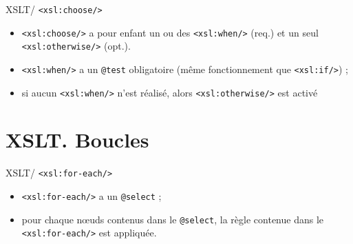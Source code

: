 \documentclass{beamer}
\begin{document}
    \begin{frame}{XSLT/ \texttt{<xsl:choose/>}}
        \Large
        \begin{itemize}
            \item \texttt{<xsl:choose/>} a pour enfant un ou des \texttt{<xsl:when/>} (req.) et un seul \texttt{<xsl:otherwise/>} (opt.).
            \bigskip
            \item \texttt{<xsl:when/>} a un \texttt{@test} obligatoire (même fonctionnement que \texttt{<xsl:if/>}) ;
            \bigskip
            \item si aucun \texttt{<xsl:when/>} n'est réalisé, alors \texttt{<xsl:otherwise/>} est activé
        \end{itemize}
    \end{frame}

    \section{XSLT. Boucles}

    \begin{frame}{XSLT/ \texttt{<xsl:for-each/>}}
        \Large
        \begin{itemize}
            \item \texttt{<xsl:for-each/>} a un \texttt{@select} ;
            \item pour chaque n\oe uds contenus dans le \texttt{@select}, la règle contenue dans le \texttt{<xsl:for-each/>} est appliquée.
        \end{itemize}
    \end{frame}
\end{document}
